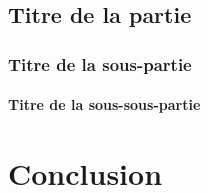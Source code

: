 \documentclass{report}
\begin{document}
\section{Titre de la partie}

\subsection{Titre de la sous-partie}

\subsubsection{Titre de la sous-sous-partie}

\chapter*{Conclusion}

\newpage
\nocite{ref1, ref2, ref3, ref4}



\end{document}
